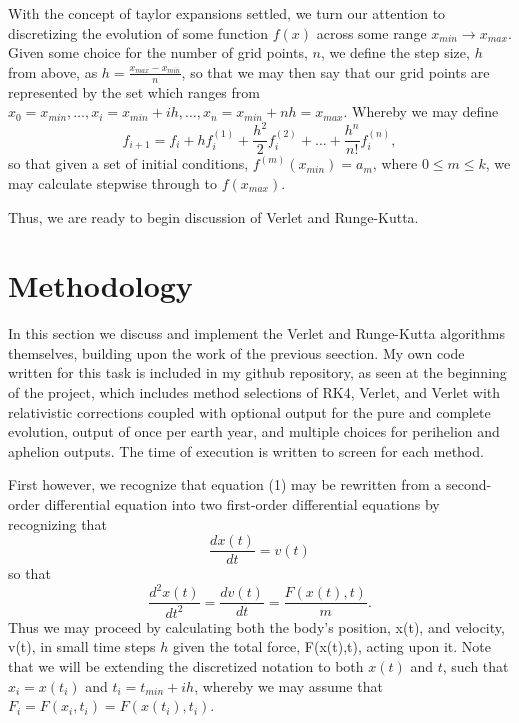 \documentclass[11pt,a4paper]{article}
\begin{document}
With the concept of taylor expansions settled, we turn our attention to discretizing the evolution of some function $f(x)$ across some range $x_{min} \rightarrow x_{max}$. Given some choice for the number of grid points, $n$, we define the step size, $h$ from above, as $h = \frac{x_{max} - x_{min}}{n}$, so that we may then say that our grid points are represented by the set which ranges from $x_0 = x_{min}, \dots, x_i = x_{min} + ih, \dots, x_n = x_{min} + nh = x_{max}$. Whereby we may define
\begin{equation}
f_{i+1} = f_i + hf^{(1)}_i + \frac{h^2}{2}f^{(2)}_i + \dots + \frac{h^n}{n!}f^{(n)}_i,
\end{equation}
so that given a set of initial conditions, $f^{(m)}(x_{min}) = a_m$, where $0\leq m \leq k$, we may calculate stepwise through to $f(x_{max})$.

Thus, we are ready to begin discussion of Verlet and Runge-Kutta. 

\section{Methodology}

In this section we discuss and implement the Verlet and Runge-Kutta algorithms themselves, building upon the work of the previous seection. My own code written for this task is included in my github repository, as seen at the beginning of the project, which includes method selections of RK4, Verlet, and Verlet with relativistic corrections coupled with optional output for the pure and complete evolution, output of once per earth year, and multiple choices for perihelion and aphelion outputs. The time of execution is written to screen for each method.

First however, we recognize that equation (1) may be rewritten from a second-order differential equation into two first-order differential equations by recognizing that
\begin{equation}
\frac{dx(t)}{dt} = v(t)
\end{equation}
so that
\begin{equation}
\frac{d^2x(t)}{dt^2} = \frac{dv(t)}{dt} = \frac{F(x(t),t)}{m}.
\end{equation}
Thus we may proceed by calculating both the body's position, x(t), and velocity, v(t), in small time steps $h$ given the total force, F(x(t),t), acting upon it. Note that we will be extending the discretized notation to both $x(t)$ and $t$, such that $x_i = x(t_i)$ and $t_i = t_{min} + ih$, whereby we may assume that $F_i = F(x_i, t_i) = F(x(t_i),t_i)$.
\end{document}

